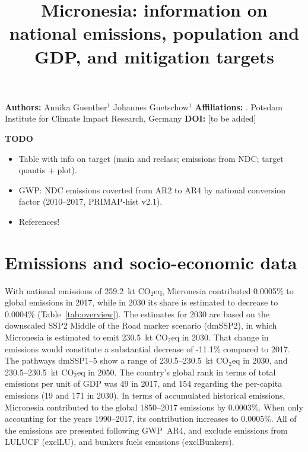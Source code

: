 \documentclass[12pt]{article}
\title{ \bfseries \color{PIKorange} Micronesia: information on national emissions, population and GDP, and mitigation targets}
\begin{document}
 \maketitle

 \noindent \textbf{Authors:} \newline
 \indent Annika Guenther$^{1}$ \newline
 \indent Johannes Guetschow$^{1}$ \newline
 \noindent \textbf{Affiliations:} \newline
 . Potsdam Institute for Climate Impact Research, Germany \newline
 \noindent \textbf{DOI:} [to be added] \newline

 \textbf{TODO}
 \begin{itemize}
 \item Table with info on target (main and reclass; emissions from NDC; target quantis + plot).
 \item GWP: NDC emissions coverted from AR2 to AR4 by national conversion factor (2010--2017, PRIMAP-hist v2.1).
 \item References!
 \end{itemize}

 \newpage %
 \section{Emissions and socio-economic data}
 \label{sec:nonLULUCFSocioEco}
 With national emissions of 259.2~kt CO$_2$eq, Micronesia contributed 0.0005\% to global emissions in 2017, while in 2030 its share is estimated to decrease to 0.0004\% (Table~\ref{tab:overview}).
 The estimates for 2030 are based on the downscaled SSP2 Middle of the Road marker scenario (dmSSP2), in which Micronesia is estimated to emit 230.5~kt CO$_2$eq in 2030.
 That change in emissions would constitute a substantial decrease of -11.1\% compared to 2017. 
 The pathways dmSSP1--5 show a range of 230.5--230.5~kt CO$_2$eq in 2030, and 230.5--230.5~kt CO$_2$eq in 2050.
 The country's global rank in terms of total emissions per unit of GDP was 49 in 2017, and 154 regarding the per-capita emissions (19 and 171 in 2030).
 In terms of accumulated historical emissions, Micronesia contributed to the global 1850--2017 emissions by 0.0003\%. 
 When only accounting for the years 1990--2017, its contribution increases to 0.0005\%.
 All of the emissions are presented following GWP~AR4, and exclude emissions from LULUCF (exclLU), and bunkers fuels emissions (exclBunkers).
\end{document}
